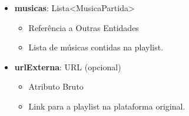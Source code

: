 \begin{itemize}
        \item \textbf{musicas}: Lista\textless MusicaPartida\textgreater  
              \begin{itemize}
                  \item Referência a Outras Entidades
                  \item Lista de músicas contidas na playlist.
              \end{itemize}
    
        \item \textbf{urlExterna}: URL (opcional)  
              \begin{itemize}
                  \item Atributo Bruto
                  \item Link para a playlist na plataforma original.
              \end{itemize}
    \end{itemize}
